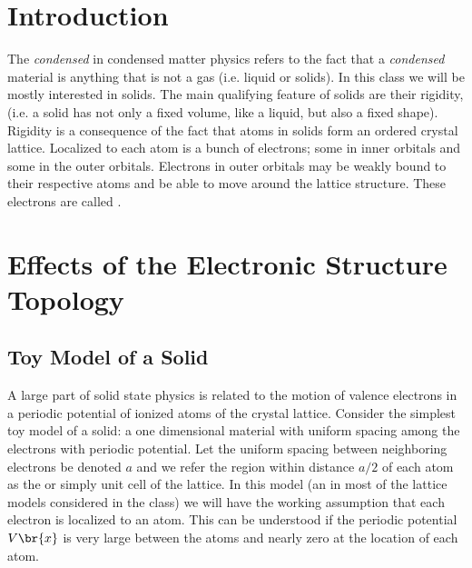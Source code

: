 \documentclass{article}
\begin{document}
\titlePage

\tableOfContents

\disclaimer

\section{Introduction}

The \textit{condensed} in condensed matter physics refers to the fact that a \textit{condensed} material is anything that is not a gas (i.e. liquid or solids). In this class we will be mostly interested in solids. The main qualifying feature of solids are their rigidity, (i.e. a solid has not only a fixed volume, like a liquid, but also a fixed shape). Rigidity is a consequence of the fact that atoms in solids form an ordered crystal lattice. Localized to each atom is a bunch of electrons; some in inner orbitals and some in the outer orbitals. Electrons in outer orbitals may be weakly bound to their respective atoms and be able to move around the lattice structure. These electrons are called .

\section{Effects of the Electronic Structure Topology}

\subsection{Toy Model of a Solid}
\label{sec:toy_model}

A large part of solid state physics is related to the motion of valence electrons in a periodic potential of ionized atoms of the crystal lattice. Consider the simplest toy model of a solid: a one dimensional material with uniform spacing among the electrons with periodic potential. Let the uniform spacing between neighboring electrons be denoted $a$ and we refer the region within distance $a/2$ of each atom as the  or simply unit cell of the lattice. In this model (an in most of the lattice models considered in the class) we will have the working assumption that each electron is localized to an atom. This can be understood if the periodic potential $V\br{x}$ is very large between the atoms and nearly zero at the location of each atom.
\end{document}

